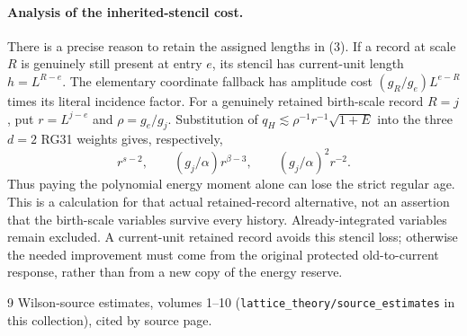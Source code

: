 \documentclass{article}
\begin{document}
\paragraph{Analysis of the inherited-stencil cost.}
There is a precise reason to retain the assigned lengths in (3). If a record at scale $R$ is genuinely still present at entry $e$, its stencil has current-unit length $h=L^{R-e}$. The elementary coordinate fallback has amplitude cost $(g_R/g_e)L^{e-R}$ times its literal incidence factor. For a genuinely retained birth-scale record $R=j$, put $r=L^{j-e}$ and $\rho=g_e/g_j$. Substitution of $q_H\lesssim \rho^{-1}r^{-1}\sqrt{1+E}$ into the three $d=2$ RG31 weights gives, respectively,
\[
 r^{s-2},\qquad (g_j/\alpha)r^{\beta-3},\qquad
 (g_j/\alpha)^2r^{-2}.
\]
Thus paying the polynomial energy moment alone can lose the strict regular age. This is a calculation for that actual retained-record alternative, not an assertion that the birth-scale variables survive every history. Already-integrated variables remain excluded. A current-unit retained record avoids this stencil loss; otherwise the needed improvement must come from the original protected old-to-current response, rather than from a new copy of the energy reserve.
\begin{thebibliography}{9}
 Wilson-source estimates, volumes 1--10 (\texttt{lattice\_theory/source\_estimates} in this collection), cited by source page.
\end{thebibliography}
\end{document}
